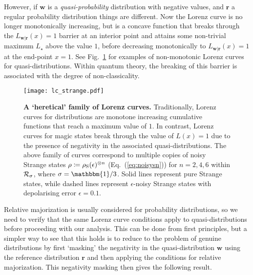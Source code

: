 \documentclass[
onecolumn,
superscriptaddress
]{revtex4-1}
\def\id{\mathbbm{1}}
\def\r{\boldsymbol{r}}
\def\w{\boldsymbol{w}}
\def\R{{\cal R}}
\begin{document}
However, if $\w$ is a \emph{quasi-probability} distribution with negative values, and $\r$ a regular probability distribution things are different. Now the Lorenz curve is no longer monotonically increasing, but is a concave function that breaks through the $L_{\w|\r}(x) = 1$ barrier at an interior point and attains some non-trivial maximum $L_\star$ above the value $1$, before decreasing monotonically to $L_{\w|\r}(x)= 1$ at the end-point $x=1$. See Fig.~\ref{fig:lcs} for examples of non-monotonic Lorenz curves for quasi-distributions. Within quantum theory, the breaking of this barrier is associated with the degree of non-classicality.

\begin{figure}
    \centering
    \texttt{[image: lc\_strange.pdf]}
    \caption{\textbf{A `heretical' family of Lorenz curves.} Traditionally, Lorenz curves for distributions are monotone increasing cumulative functions that reach a maximum value of $1$. In contrast, Lorenz curves for magic states break through the value of $L(x)=1$ due to the presence of negativity in the associated quasi-distributions. The above family of curves correspond to multiple copies of noisy Strange states $\rho\coloneqq\rho_{\rm{S}}(\epsilon)^{\otimes n}$ (Eq.~(\ref{eq:noisysn})) for $n=2,4,6$ within $\R_{\sigma}$, where $\sigma = \id/3$. Solid lines represent pure Strange states, while dashed lines represent $\epsilon$-noisy Strange states with depolarising error $\epsilon = 0.1$.
    }
    \label{fig:lcs}
\end{figure}

Relative majorization is usually considered for probability distributions, so we need to verify that the same Lorenz curve conditions apply to quasi-distributions before proceeding with our analysis. This can be done from first principles, but a simpler way to see that this holds is to reduce to the problem of genuine distributions by first `masking' the negativity in the quasi-distribution $\w$ using the reference distribution $\r$ and then applying the conditions for relative majorization. This negativity masking then gives the following result.
\end{document}
